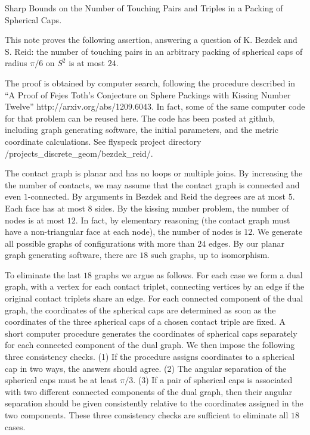 Sharp Bounds on the Number of Touching Pairs and Triples in a
Packing of Spherical Caps.



This note proves the following assertion, answering a question of
K. Bezdek and S. Reid: the number of touching pairs in an arbitrary
packing of spherical caps of radius $\pi/6$ on $S^2$ is at most $24$.

The proof is obtained by computer search, following the procedure
described in ``A Proof of Fejes Toth's Conjecture on Sphere Packings
with Kissing Number Twelve'' http://arxiv.org/abs/1209.6043.  In fact,
some of the same computer code for that problem can be reused here.
The code has been posted at github, including graph
generating software, the initial parameters, and the metric coordinate
calculations.  See flyspeck project directory /projects_discrete_geom/bezdek_reid/.

The contact graph is planar and has no loops or multiple joins.  By
increasing the the number of contacts, we may assume that the contact
graph is connected and even $1$-connected.  By arguments in Bezdek and
Reid the degrees are at most $5$.  Each face has at most $8$ sides.
By the kissing number problem, the number of nodes is at most $12$.
In fact, by elementary reasoning (the contact graph must have a
non-triangular face at each node), the number of nodes is $12$.  We
generate all possible graphs of configurations with more than $24$
edges.  By our planar graph generating software, there are $18$ such
graphs, up to isomorphism.

To eliminate the last $18$ graphs we argue as follows. For each case
we form a dual graph, with a vertex for each contact triplet,
connecting vertices by an edge if the original contact triplets share
an edge.  For each connected component of the dual graph, the
coordinates of the spherical caps are determined as soon as the
coordinates of the three spherical caps of a chosen contact triple are
fixed.  A short computer procedure generates the coordinates of
spherical caps separately for each connected component of the dual
graph.  We then impose the following three consistency checks. (1) If
the procedure assigns coordinates to a spherical cap in two ways, the
answers should agree. (2) The angular separation of the spherical caps
must be at least $\pi/3$.  (3) If a pair of spherical caps is
associated with two different connected components of the dual graph,
then their angular separation should be given consistently relative to
the coordinates assigned in the two components.  These three
consistency checks are sufficient to eliminate all $18$ cases.

